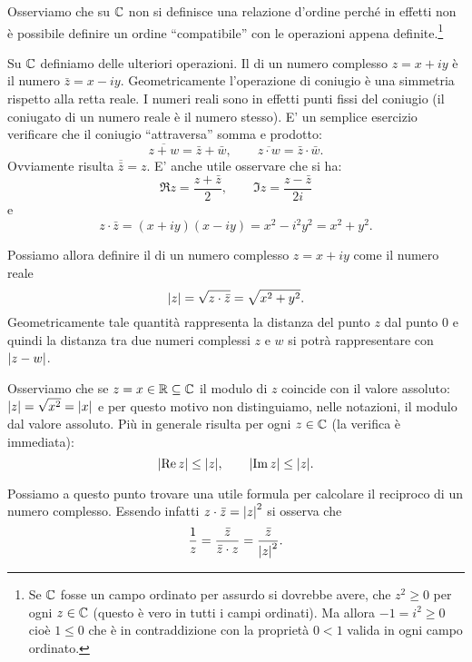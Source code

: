 Osserviamo che su $\mathbb C$ non si definisce una relazione d'ordine perché
in effetti non è possibile definire un ordine ``compatibile'' con le operazioni
appena definite.\footnote{%
Se $\mathbb C$ fosse un campo ordinato per assurdo
si dovrebbe avere,
che $z^2\ge 0$ per ogni $z\in \mathbb C$ (questo è vero in tutti i campi ordinati). 
Ma
allora $-1 =i^2 \ge 0$ cioè $1\le 0$ che è in contraddizione
con la proprietà $0<1$ valida in ogni campo ordinato.
}

Su $\mathbb C$ definiamo delle ulteriori operazioni.
Il 
di un numero complesso $z=x+iy$ è il numero
$\bar z = x - iy$. Geometricamente l'operazione di coniugio è una simmetria
rispetto alla retta reale. I numeri reali sono in effetti punti fissi del
coniugio (il coniugato di un numero reale è il numero stesso).
E' un semplice esercizio verificare che il coniugio ``attraversa''
somma e prodotto:
\[
\overline{z+w} = \bar z + \bar w, \qquad
\overline{z\cdot w} = \bar z \cdot \bar w.
\]
Ovviamente risulta $\overline {\bar z} = z$.
E' anche utile osservare che si ha:
\begin{equation}\label{eq:re_im}
  \Re z = \frac{z+\bar z}{2}, \qquad
  \Im z = \frac{z-\bar z}{2i}
\end{equation}
e
\[
z \cdot \bar z = (x+iy)(x-iy) = x^2-i^2y^2 = x^2+y^2.
\]

Possiamo allora definire il
 di un numero complesso $z=x+iy$
come il numero reale
\[
{\left|z\right|} = \sqrt{z\cdot\bar z} = \sqrt{x^2+y^2}.
\]
Geometricamente tale quantità rappresenta la distanza del punto $z$
dal punto $0$ e quindi la distanza tra due numeri complessi $z$ e
$w$ si potrà rappresentare con ${\left|z-w\right|}$.

Osserviamo che se $z = x \in \mathbb R \subseteq \mathbb C$ il modulo di $z$ coincide
con il valore assoluto: ${\left|z\right|} = \sqrt{x^2} = {\left|x\right|}$ e per questo
motivo non distinguiamo, nelle notazioni, il modulo dal valore assoluto.
Più in generale risulta per ogni $z\in \mathbb C$ (la verifica è immediata):
\[
  {\left|\operatorname{Re} z\right|} \le {\left|z\right|}, \qquad
  {\left|\operatorname{Im}z\right|} \le {\left|z\right|}.
\]

Possiamo a questo punto trovare una utile formula per calcolare
il reciproco di un numero complesso. Essendo infatti
$z\cdot \bar z = {\left|z\right|}^2$ si osserva che
\[
  \frac{1}{z}
  = \frac{\bar z}{ \bar z \cdot z}
  = \frac{\bar z}{{\left|z\right|}^2}.
\]


